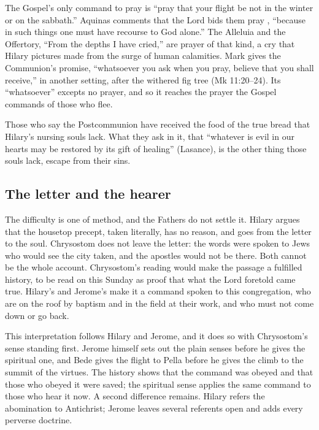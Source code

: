 The Gospel's only command to pray is ``pray that your flight be not in the
winter or on the sabbath.'' Aquinas comments that the Lord bids them pray
, ``because in such
things one must have recourse to God alone.'' The Alleluia and the
Offertory, ``From the depths I have cried,'' are prayer of that kind, a cry
that Hilary pictures made from the surge of human calamities. Mark gives the
Communion's promise, ``whatsoever you ask when you pray, believe that you
shall receive,'' in another setting, after the withered fig tree (Mk
11:20--24). Its ``whatsoever'' excepts no prayer, and so it reaches the
prayer the Gospel commands of those who flee.

Those who say the Postcommunion have received the food of the true bread
that Hilary's nursing souls lack. What they ask in it, that ``whatever is evil
in our hearts may be restored by its gift of healing'' (Lasance), is the other
thing those souls lack, escape from their sins.

\subsection{The letter and the hearer}
\label{sec:flight-difficulty}

The difficulty is one of method, and the Fathers do not settle it. Hilary
argues that the housetop precept, taken literally, has no reason, and goes
from the letter to the soul. Chrysostom does not leave the letter: the words
were spoken to Jews who would see the city taken, and the apostles would not
be there. Both cannot be the whole account. Chrysostom's reading would make
the passage a fulfilled history, to be read on this Sunday as proof that what
the Lord foretold came true. Hilary's and Jerome's make it a command spoken to
this congregation, who are on the roof by baptism and in the field at their
work, and who must not come down or go back.

This interpretation follows Hilary and Jerome, and it does so with
Chrysostom's sense standing first. Jerome himself sets out the plain senses
before he gives the spiritual one, and Bede gives the flight to Pella
before he gives the climb to the summit of the virtues. The history shows
that the command was obeyed and that those who obeyed it were saved; the
spiritual sense applies the same command to those who hear it now. A second
difference remains. Hilary refers the abomination to Antichrist; Jerome
leaves several referents open and adds every perverse doctrine.

